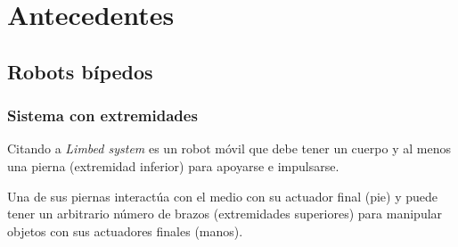 \documentclass{book}
\begin{document}
\chapter{Antecedentes}
	\section{Robots bípedos}
		\subsection{Sistema con extremidades}
Citando a \cite{siciliano2016springer}	\textit{Limbed system} es un robot móvil que debe tener un cuerpo y al menos una pierna (extremidad inferior) para apoyarse e impulsarse.

	Una de sus piernas interactúa con el medio con su actuador final (pie) y 			puede tener un arbitrario número de brazos (extremidades superiores) para 					manipular objetos con sus actuadores finales (manos). \\ \\
	
\end{document}
